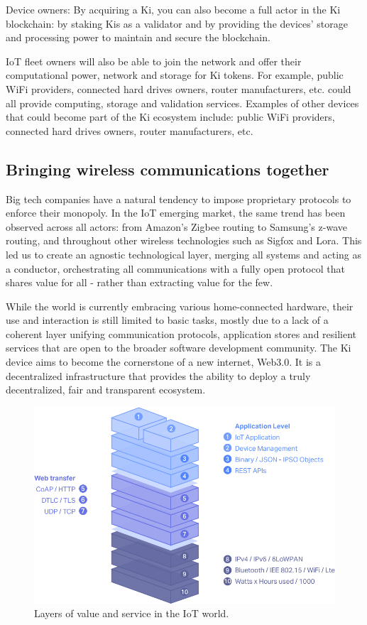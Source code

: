 Device owners: By acquiring a Ki, you can also become a full actor in the Ki blockchain: by staking Kis as a validator and by providing the devices' storage and processing power to maintain and secure the blockchain.

IoT fleet owners will also be able to join the network and offer their computational power, network and storage for Ki tokens. For example, public WiFi providers, connected hard drives owners, router manufacturers, etc. could all provide computing, storage and validation services. Examples of other devices that could become part of the Ki ecosystem include: public WiFi providers, connected hard drives owners, router manufacturers, etc.


\subsection{Bringing wireless communications together}
\label{sec:kiecosystemwireless}
Big tech companies have a natural tendency to impose proprietary protocols to enforce their monopoly. In the IoT emerging market, the same trend has been observed across all actors: from Amazon's Zigbee routing to Samsung's z-wave routing, and throughout other wireless technologies such as Sigfox and Lora. This led us to create an agnostic technological layer, merging all systems and acting as a conductor, orchestrating all communications with a fully open protocol that shares value for all - rather than extracting value for the few.

While the world is currently embracing various home-connected hardware, their use and interaction is still limited to basic tasks, mostly due to a lack of a coherent layer unifying communication protocols, application stores and resilient services that are open to the broader software development community. The Ki device aims to become the cornerstone of a new internet, Web3.0. It is a decentralized infrastructure that provides the ability to deploy a truly decentralized, fair and transparent ecosystem.

\begin{figure}[!ht]
	\includegraphics[width=\linewidth, trim= 0cm 0cm 0cm 0cm, clip]{Figures/iot.png}
	\caption{Layers of value and service in the IoT world.}
	\label{fig:iot}
\end{figure}

